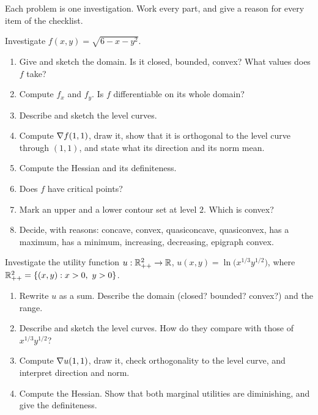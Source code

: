 Each problem is one investigation. Work every part, and give a reason for
every item of the checklist.

\begin{problems}
  \item Investigate $f(x,y)=\sqrt{6-x-y^{2}}$.
        \begin{enumerate}[label=(\alph*),leftmargin=1.8em,itemsep=0.2ex]
          \item Give and sketch the domain. Is it closed, bounded, convex?
                What values does $f$ take?
          \item Compute $f_{x}$ and $f_{y}$. Is $f$ differentiable on its
                whole domain?
          \item Describe and sketch the level curves.
          \item Compute $\nabla f(1,1)$, draw it, show that it is orthogonal
                to the level curve through $(1,1)$, and state what its
                direction and its norm mean.
          \item Compute the Hessian and its definiteness.
          \item Does $f$ have critical points?
          \item Mark an upper and a lower contour set at level $2$. Which is
                convex?
          \item Decide, with reasons: concave, convex, quasiconcave,
                quasiconvex, has a maximum, has a minimum, increasing,
                decreasing, epigraph convex.
        \end{enumerate}
  \item Investigate the utility function
        $u:\mathbb{R}^{2}_{++}\to\mathbb{R}$, $u(x,y)=\ln\bigl(x^{1/3}y^{1/2}\bigr)$, where
        $\R^{2}_{++}=\{(x,y):x>0,\ y>0\}$.
        \begin{enumerate}[label=(\alph*),leftmargin=1.8em,itemsep=0.2ex]
          \item Rewrite $u$ as a sum. Describe the domain (closed? bounded?
                convex?) and the range.
          \item Describe and sketch the level curves. How do they compare
                with those of $x^{1/3}y^{1/2}$?
          \item Compute $\nabla u(1,1)$, draw it, check orthogonality to the
                level curve, and interpret direction and norm.
          \item Compute the Hessian. Show that both marginal utilities are
                diminishing, and give the definiteness.

\end{enumerate}
\end{problems}
